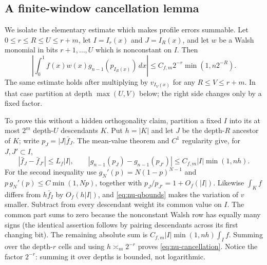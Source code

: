 \documentclass[11pt]{article}
\numberwithin{equation}{section}
\newcommand{\1}{\mathbf 1}\newcommand{\F}{\mathcal F}\newcommand{\D}{\mathcal D}
\begin{document}
\subsection{A finite-window cancellation lemma}
We isolate the elementary estimate which makes profile errors summable.
Let $0\le r\le R\le U\le r+m$, let $I=I_r(x)$ and $J=I_R(x)$, and let $w$ be a
Walsh monomial in bits $r+1,\ldots,U$ which is nonconstant on $I$.  Then
\begin{equation}\label{eq:nu-cancellation}
 \left|\int_0^1 f(x)w(x)g_{n-1}(p_{I_R(x)})\,dx\right|
 \le C_{f,m}2^{-r}\min(1,n2^{-R}).                             \tag{N.13}
\end{equation}
The same estimate holds after multiplying by $v_{I_V(x)}$ for any
$R\le V\le r+m$.  In that case partition at depth $\max(U,V)$ below;
the right side changes only by a fixed factor.

To prove this without a hidden orthogonality claim, partition a fixed $I$ into
its at most $2^m$ depth-$U$ descendants $K$.  Put $h=|K|$ and let $J$
be the depth-$R$ ancestor of $K$; write $p_J=|J|\bar f_J$.  The mean-value theorem and $C^1$ regularity give, for
$J,J'\subset I$,
\begin{equation}\label{eq:nu-localvariation}
 |\bar f_J-\bar f_{J'}|\le L_f|I|,\qquad
 |g_{n-1}(p_J)-g_{n-1}(p_{J'})|
 \le C_{f,m}|I|\min(1,nh).                                       \tag{N.14}
\end{equation}
For the second inequality use
$g_N'(p)=N(1-p)^{N-1}$ and
$p\,g_N'(p)\le C\min(1,Np)$, together with
$p_J/p_{J'}=1+O_f(|I|)$.  Likewise
$\int_Kf$ differs from $h\bar f_I$ by
$O_f(h|I|)$, and \eqref{eq:nu-qbounds} makes the variation of $v$ smaller.
Subtract from every descendant weight its common value on $I$.  The common
part sums to zero because the nonconstant Walsh row has equally many signs
(the identical assertion follows by pairing descendants across its first
changing bit).  The remaining absolute sum is
$C_{f,m}|I|\min(1,nh)\int_If$.  Summing over the depth-$r$ cells and using
$h\asymp_m2^{-r}$ proves \eqref{eq:nu-cancellation}.  Notice the factor
$2^{-r}$: summing it over depths is bounded, not logarithmic.
\end{document}
